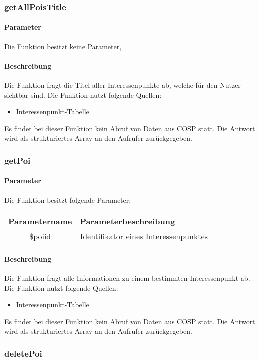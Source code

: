 \subsubsection{getAllPoisTitle}
\paragraph{Parameter} Die Funktion besitzt keine Parameter,
\paragraph{Beschreibung} Die Funktion fragt die Titel aller Interessenpunkte ab, welche für den Nutzer sichtbar sind. Die Funktion nutzt folgende Quellen:
\begin{itemize}
	\item Interessenpunkt-Tabelle
\end{itemize}
Es findet bei dieser Funktion kein Abruf von Daten aus {\glqq COSP\grqq} statt. Die Antwort wird als strukturiertes Array an den Aufrufer zurückgegeben.
\subsubsection{getPoi}
\paragraph{Parameter} Die Funktion besitzt folgende Parameter:
\begin{table}[H]
	\begin{tabular}{|c|p{11cm}|}
		\hline
		\textbf{Parametername} & \textbf{Parameterbeschreibung} \\ \hline
		\$poiid & Identifikator eines Interessenpunktes \\ \hline
	\end{tabular}
\end{table}
\paragraph{Beschreibung} Die Funktion fragt alle Informationen zu einem bestimmten Interessenpunkt ab. Die Funktion nutzt folgende Quellen:
\begin{itemize}
	\item Interessenpunkt-Tabelle
\end{itemize}
Es findet bei dieser Funktion kein Abruf von Daten aus {\glqq COSP\grqq} statt. Die Antwort wird als strukturiertes Array an den Aufrufer zurückgegeben.
\subsubsection{deletePoi}
